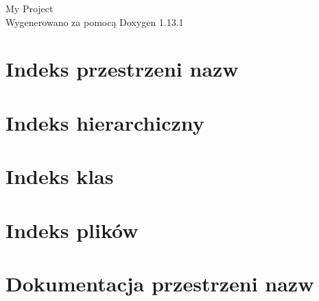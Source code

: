 \documentclass[twoside]{book}
\newcommand{\+}{\discretionary{\mbox{\scriptsize$\hookleftarrow$}}{}{}}
\newcommand{\clearemptydoublepage}{%
    \newpage{\pagestyle{empty}\cleardoublepage}%
  }
\begin{document}
  \raggedbottom
    \hypersetup{pageanchor=false,
                bookmarksnumbered=true,
                pdfencoding=unicode
               }
  \begin{titlepage}
  \vspace*{7cm}
  \begin{center}%
  {\Large My Project}\\
  \vspace*{1cm}
  {\large Wygenerowano za pomocą Doxygen 1.13.1}\\
  \end{center}
  \end{titlepage}
  \clearemptydoublepage
  \tableofcontents
  \clearemptydoublepage
  \hypersetup{pageanchor=true}
\chapter{Indeks przestrzeni nazw}

\chapter{Indeks hierarchiczny}

\chapter{Indeks klas}

\chapter{Indeks plików}

\chapter{Dokumentacja przestrzeni nazw}






\end{document}
